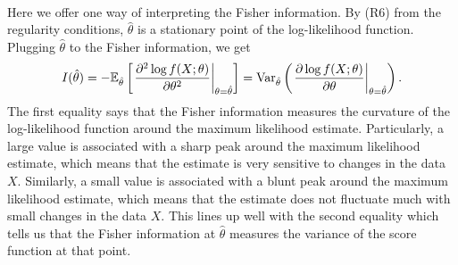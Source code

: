 $ $\\
Here we offer one way of interpreting the Fisher information. By (R6) from the regularity conditions, $\hat{\theta}$ is a stationary point of the log-likelihood function. Plugging $\hat{\theta}$ to the Fisher information, we get
\begin{align*}
I(\hat{\theta}) = -\mathbb{E}_{\hat{\theta}}\left[ \left.\frac{\partial^2\log f(X;\theta)}{\partial \theta^2}\right\vert_{\theta=\hat{\theta}} \right] = \text{Var}_{\hat{\theta}}\left( \left.\frac{\partial\log f(X;\theta)}{\partial \theta}\right\vert_{\theta=\hat{\theta}} \right).
\end{align*}
The first equality says that the Fisher information measures the curvature of the log-likelihood function around the maximum likelihood estimate. Particularly, a large value is associated with a sharp peak around the maximum likelihood estimate, which means that the estimate is very sensitive to changes in the data $X$. Similarly, a small value is associated with a blunt peak around the maximum likelihood estimate, which means that the estimate does not fluctuate much with small changes in the data $X$. This lines up well with the second equality which tells us that the Fisher information at $\hat{\theta}$ measures the variance of the score function at that point.
